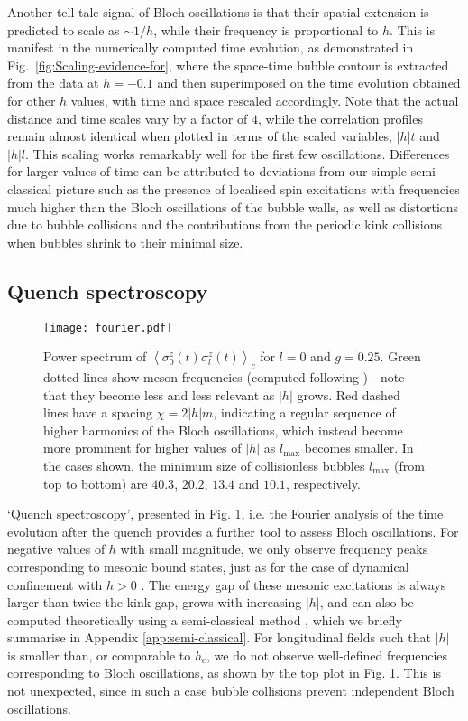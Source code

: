 \documentclass[amsmath,amssymb,11pt]{article}
\numberwithin{equation}{section}
\numberwithin{figure}{section}
\numberwithin{table}{section}
\begin{document}
Another tell-tale signal of Bloch oscillations is that their spatial extension is predicted to scale
as $\sim 1/h$, while their frequency is proportional to 
$h$. This is manifest in the numerically computed
time evolution, as demonstrated in Fig.~\ref{fig:Scaling-evidence-for},
where the space-time bubble contour is extracted from the data at
$h=-0.1$ and then superimposed on the time evolution obtained for
other $h$ values, with  time and space rescaled accordingly. 
Note that the actual distance and time scales vary
by a factor of $4$, while  the correlation profiles 
remain almost identical when plotted  in terms of the scaled
variables, $|h|t$ and $|h|l$. This scaling works remarkably well for the first few oscillations. Differences for larger values of time can be attributed to deviations from our simple semi-classical picture such as  the  presence of localised spin excitations with frequencies much higher than the Bloch oscillations of the bubble walls, as well as distortions due to bubble collisions and the contributions from the periodic kink collisions  when bubbles shrink to their minimal size.

\subsection{Quench spectroscopy}\label{subsec:quench_spectroscopy}

\begin{figure}[t]
\centering
\texttt{[image: fourier.pdf]}
\caption{
\label{fig:quench_spectroscopy} 
Power spectrum of $\left\langle \sigma_{0}^{z}(t)\sigma_{l}^{z}(t)\right\rangle _{c}$ for $l=0$ and $g=0.25$. Green dotted lines show meson frequencies (computed following \cite{2017NatPh..13..246K}) - note that they become less and less relevant as $|h|$ grows. Red dashed lines have a spacing $\chi = 2 |h| m$, {indicating a regular sequence of higher harmonics of the Bloch oscillations, which instead become more prominent for higher values of $|h|$ as $l_\mathrm{max}$ becomes smaller. In the cases shown, the minimum size of collisionless bubbles $l_\mathrm{max}$ (from top to bottom) are $40.3$, $20.2$, $13.4$ and $10.1$, respectively.}}
\end{figure}


`Quench spectroscopy', presented in Fig. \ref{fig:quench_spectroscopy}, i.e. the Fourier analysis of the time evolution after the quench provides a further tool to assess Bloch oscillations. {For negative values of $h$ with small magnitude, we only observe  frequency peaks corresponding to mesonic bound states, just as for the case of dynamical confinement with $h>0$ \cite{2017NatPh..13..246K}}. The energy gap of these mesonic excitations  is always larger than twice the kink gap, grows with increasing $|h|$, and  can also be computed theoretically using a semi-classical method \cite{2008JSP...131..917R}, which we briefly summarise in Appendix \ref{app:semi-classical}. {For longitudinal fields such that $|h|$ is smaller than, or comparable to $h_c$, we do not observe well-defined frequencies corresponding to Bloch oscillations, as shown by the top plot in Fig. \ref{fig:quench_spectroscopy}. This is not unexpected, since in such a case bubble collisions prevent independent Bloch oscillations.}
\end{document}
